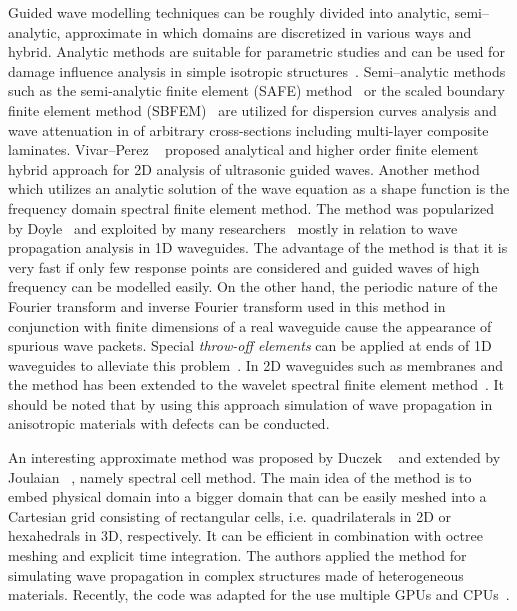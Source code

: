 Guided wave modelling techniques can be roughly divided into analytic, semi--analytic, approximate in which domains are discretized in various ways and hybrid. Analytic methods are suitable for parametric studies and can be used for damage influence analysis in simple isotropic structures~\cite{Giurgiutiu2014}. Semi--analytic methods such as the semi-analytic finite element (SAFE) method~\cite{Bartoli2006} or the scaled boundary finite element method (SBFEM)~\cite{Gravenkamp2014} are utilized for dispersion curves analysis and wave attenuation in   of arbitrary cross-sections including multi-layer composite laminates. Vivar--Perez \etal~\cite{Vivar-Perez2014} proposed analytical and higher order finite element hybrid approach for 2D analysis of ultrasonic guided waves. Another method which utilizes an analytic solution of the wave equation as a shape function is the frequency domain spectral finite element method. The method was popularized by Doyle~\cite{Doyle1989} and exploited by many researchers~\cite{RoyMahapatra2003,Palacz2005} mostly in relation to wave propagation analysis in 1D waveguides. The advantage of the method is that it is very fast if only  few response points are considered and guided waves of high frequency can be modelled easily. On the other hand, the periodic nature of the Fourier transform and inverse Fourier transform used in this method in conjunction with finite dimensions of a real waveguide cause the appearance of spurious wave packets. Special \emph{throw-off elements} can be applied at ends of 1D waveguides to alleviate this problem~\cite{Doyle1989}. In 2D waveguides such as membranes and   the method has been extended to the wavelet spectral finite element method~\cite{Mitra2008,Yang2016}. It should be noted that by using this approach simulation of wave propagation in anisotropic materials with defects can be conducted.

An interesting approximate method was proposed by Duczek \etal~\cite{Duczek2014} and extended by Joulaian \etal~\cite{Joulaian2014}, namely spectral cell method. The main idea of the method is to embed physical domain into a bigger domain that can be easily meshed into a Cartesian grid consisting of rectangular cells, i.e. quadrilaterals in 2D or hexahedrals in 3D, respectively. It can be efficient in combination with octree meshing and explicit time integration. The authors applied the method for simulating wave propagation in complex structures made of heterogeneous materials. Recently, the code was adapted for the use   multiple GPUs and CPUs~\cite{Mossaiby2019}. 

